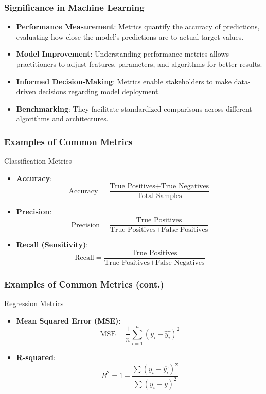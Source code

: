 \documentclass{beamer}
\begin{document}
\begin{frame}[fragile]
    \frametitle{Significance in Machine Learning}
    \begin{itemize}
        \item \textbf{Performance Measurement}: Metrics quantify the accuracy of predictions, evaluating how close the model’s predictions are to actual target values.
        \item \textbf{Model Improvement}: Understanding performance metrics allows practitioners to adjust features, parameters, and algorithms for better results.
        \item \textbf{Informed Decision-Making}: Metrics enable stakeholders to make data-driven decisions regarding model deployment.
        \item \textbf{Benchmarking}: They facilitate standardized comparisons across different algorithms and architectures.
    \end{itemize}
\end{frame}

\begin{frame}[fragile]
    \frametitle{Examples of Common Metrics}
    \begin{block}{Classification Metrics}
        \begin{itemize}
            \item \textbf{Accuracy}:
            \[
            \text{Accuracy} = \frac{\text{True Positives} + \text{True Negatives}}{\text{Total Samples}}
            \]
            \item \textbf{Precision}:
            \[
            \text{Precision} = \frac{\text{True Positives}}{\text{True Positives} + \text{False Positives}}
            \]
            \item \textbf{Recall (Sensitivity)}:
            \[
            \text{Recall} = \frac{\text{True Positives}}{\text{True Positives} + \text{False Negatives}}
            \]
        \end{itemize}
    \end{block}
\end{frame}

\begin{frame}[fragile]
    \frametitle{Examples of Common Metrics (cont.)}
    \begin{block}{Regression Metrics}
        \begin{itemize}
            \item \textbf{Mean Squared Error (MSE)}:
            \[
            \text{MSE} = \frac{1}{n} \sum_{i=1}^{n} (y_{i} - \hat{y_{i}})^{2}
            \]
            \item \textbf{R-squared}:
            \[
            R^2 = 1 - \frac{\sum{(y_{i} - \hat{y_{i}})^2}}{\sum{(y_{i} - \bar{y})^2}}
            \]
        \end{itemize}
    \end{block}
\end{frame}
\end{document}
